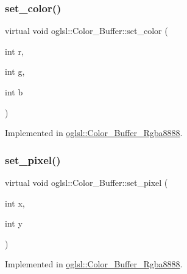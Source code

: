 \subsubsection{\texorpdfstring{set\+\_\+color()}{set\_color()}}
{\footnotesize\ttfamily virtual void oglsl\+::\+Color\+\_\+\+Buffer\+::set\+\_\+color (\begin{DoxyParamCaption}\item[{int}]{r,  }\item[{int}]{g,  }\item[{int}]{b }\end{DoxyParamCaption})\hspace{0.3cm}{\ttfamily [pure virtual]}}



Implemented in \mbox{\hyperlink{classoglsl_1_1_color___buffer___rgba8888_a5860a8570962cd69e864e2dc43884373}{oglsl\+::\+Color\+\_\+\+Buffer\+\_\+\+Rgba8888}}.

\mbox{\label{classoglsl_1_1_color___buffer_a45662e4f8c5d9776eb125d1c605d36d8}} 
\subsubsection{\texorpdfstring{set\+\_\+pixel()}{set\_pixel()}\hspace{0.1cm}{\footnotesize\ttfamily [1/2]}}
{\footnotesize\ttfamily virtual void oglsl\+::\+Color\+\_\+\+Buffer\+::set\+\_\+pixel (\begin{DoxyParamCaption}\item[{int}]{x,  }\item[{int}]{y }\end{DoxyParamCaption})\hspace{0.3cm}{\ttfamily [pure virtual]}}



Implemented in \mbox{\hyperlink{classoglsl_1_1_color___buffer___rgba8888_a88a98459049a2366ef58a08a1716b9f9}{oglsl\+::\+Color\+\_\+\+Buffer\+\_\+\+Rgba8888}}.

\mbox{\label{classoglsl_1_1_color___buffer_aa3b45a2c94da2a9b3e410637152a6a91}} 
